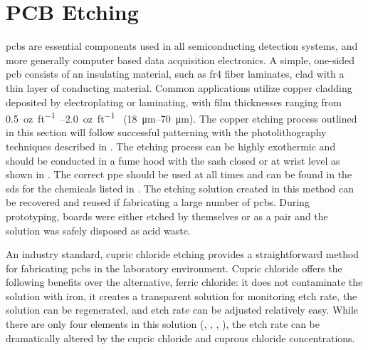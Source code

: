 \documentclass[../../main.tex]{subfiles}
\begin{document}
%
    \section{PCB Etching}%
    \label{app:general-chemistry:pcb-etching}%
    \Glspl{pcb} are essential components used in all semiconducting detection systems, and more generally computer based data acquisition electronics. 
    A simple, one-sided \gls{pcb} consists of an insulating material, such as \gls{fr4} fiber laminates, clad with a thin layer of conducting material. 
    Common applications utilize copper cladding deposited by electroplating or laminating, with film thicknesses ranging from \SIrange{0.5}{2.0}{oz\per ft} (\SIrange{18}{70}{\micro\meter}).
    The copper etching process outlined in this section will follow successful patterning with the photolithography techniques described in .
    The etching process can be highly exothermic and should be conducted in a fume hood with the sash closed or at wrist level as shown in .
    The correct \gls{ppe} should be used at all times and can be found in the \gls{sds} for the chemicals listed in .
    The etching solution created in this method can be recovered and reused if fabricating a large number of \glspl{pcb}.
    During prototyping, boards were either etched by themselves or as a pair and the solution was safely disposed as acid waste.
    \par%
    An industry standard, cupric chloride etching provides a straightforward method for fabricating \glspl{pcb} in the laboratory environment.
    Cupric chloride offers the following benefits over the alternative, ferric chloride: it does not contaminate the solution with iron, it creates a transparent solution for monitoring etch rate, the solution can be regenerated, and etch rate can be adjusted relatively easy.
    While there are only four elements in this solution (, , , ), the etch rate can be dramatically altered by the cupric chloride and cuprous chloride concentrations.
    \par%
\end{document}
